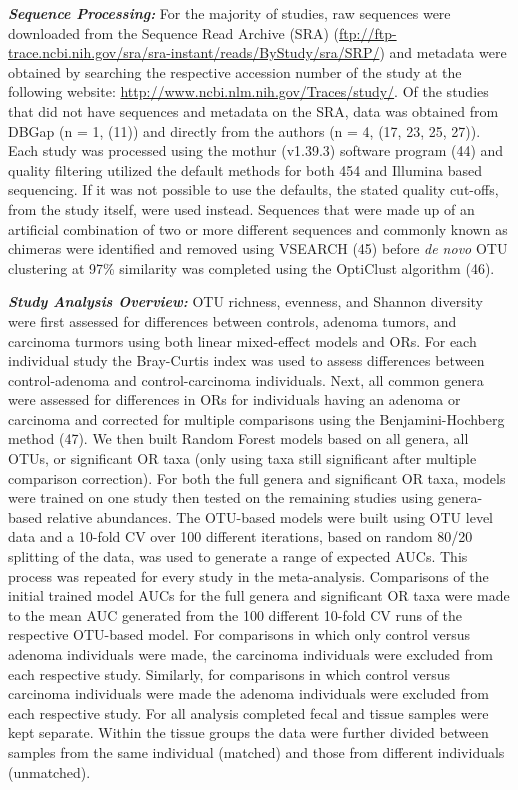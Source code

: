 \documentclass[12pt,]{article}
\begin{document}
\textbf{\emph{Sequence Processing:}} For the majority of studies, raw
sequences were downloaded from the Sequence Read Archive (SRA)
(\url{ftp://ftp-trace.ncbi.nih.gov/sra/sra-instant/reads/ByStudy/sra/SRP/})
and metadata were obtained by searching the respective accession number
of the study at the following website:
\url{http://www.ncbi.nlm.nih.gov/Traces/study/}. Of the studies that did
not have sequences and metadata on the SRA, data was obtained from DBGap
(n = 1, (11)) and directly from the authors (n = 4, (17, 23, 25, 27)).
Each study was processed using the mothur (v1.39.3) software program
(44) and quality filtering utilized the default methods for both 454 and
Illumina based sequencing. If it was not possible to use the defaults,
the stated quality cut-offs, from the study itself, were used instead.
Sequences that were made up of an artificial combination of two or more
different sequences and commonly known as chimeras were identified and
removed using VSEARCH (45) before \emph{de novo} OTU clustering at 97\%
similarity was completed using the OptiClust algorithm (46).

\textbf{\emph{Study Analysis Overview:}} OTU richness, evenness, and
Shannon diversity were first assessed for differences between controls,
adenoma tumors, and carcinoma turmors using both linear mixed-effect
models and ORs. For each individual study the Bray-Curtis index was used
to assess differences between control-adenoma and control-carcinoma
individuals. Next, all common genera were assessed for differences in
ORs for individuals having an adenoma or carcinoma and corrected for
multiple comparisons using the Benjamini-Hochberg method (47). We then
built Random Forest models based on all genera, all OTUs, or significant
OR taxa (only using taxa still significant after multiple comparison
correction). For both the full genera and significant OR taxa, models
were trained on one study then tested on the remaining studies using
genera-based relative abundances. The OTU-based models were built using
OTU level data and a 10-fold CV over 100 different iterations, based on
random 80/20 splitting of the data, was used to generate a range of
expected AUCs. This process was repeated for every study in the
meta-analysis. Comparisons of the initial trained model AUCs for the
full genera and significant OR taxa were made to the mean AUC generated
from the 100 different 10-fold CV runs of the respective OTU-based
model. For comparisons in which only control versus adenoma individuals
were made, the carcinoma individuals were excluded from each respective
study. Similarly, for comparisons in which control versus carcinoma
individuals were made the adenoma individuals were excluded from each
respective study. For all analysis completed fecal and tissue samples
were kept separate. Within the tissue groups the data were further
divided between samples from the same individual (matched) and those
from different individuals (unmatched).
\end{document}
